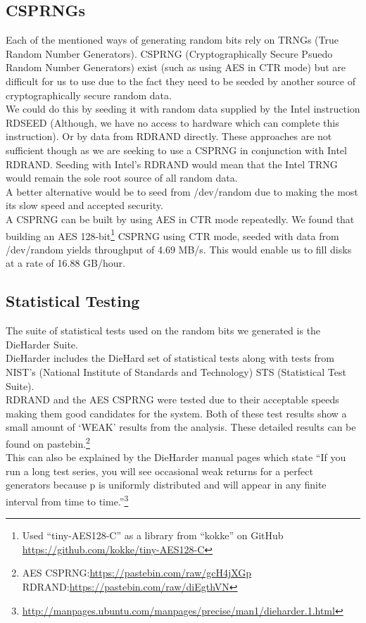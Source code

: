 \documentclass{paper}
\begin{document}
		\subsection{CSPRNGs}
			Each of the mentioned ways of generating random bits rely on TRNGs (True Random Number Generators).  CSPRNG (Cryptographically Secure Psuedo Random Number Generators) exist (such as using AES in CTR mode) but are difficult for us to use due to the fact they need 
			to be seeded by another source of cryptographically secure random data.\\ 
			We could do this by seeding it with random data supplied by the Intel instruction RDSEED (Although, we have no access to hardware which can complete this instruction). Or by data from RDRAND directly. These approaches are not sufficient though as we are seeking to use a CSPRNG in conjunction with Intel RDRAND. Seeding with Intel's RDRAND would mean that the Intel TRNG would remain 	the sole root source of all random data.\\
			A better alternative would be to seed from /dev/random due to making the most its slow speed and accepted security.\\
			
			A CSPRNG can be built by using AES in CTR mode repeatedly. We found that building an AES 128-bit\footnote{Used ``tiny-AES128-C'' as a library from ``kokke'' on GitHub \url{https://github.com/kokke/tiny-AES128-C}} CSPRNG using CTR mode, seeded with data from /dev/random yields throughput of 4.69 MB/s. This would enable us to fill disks at a rate of 16.88 GB/hour. 
			
		\subsection{Statistical Testing}
			The suite of statistical tests used on the random bits we generated is the DieHarder Suite.\\ 
			DieHarder includes the DieHard set of statistical tests along with tests from NIST's (National Institute of Standards and Technology) STS (Statistical Test Suite).\\ 
			RDRAND and the AES CSPRNG were tested due to their acceptable speeds making them good candidates for the system. Both of these test results show a small amount of `WEAK' results from the analysis. These detailed results can be found on pastebin.\footnote{AES CSPRNG:\url{https://pastebin.com/raw/gcH4jXGp} RDRAND:\url{https://pastebin.com/raw/diEgthVN}}\\
			This can also be explained by the DieHarder manual pages which state ``If you run a long test series, you will see occasional weak returns for a perfect generators because p is uniformly distributed and will appear in any finite interval from time to time.''\footnote{\url{http://manpages.ubuntu.com/manpages/precise/man1/dieharder.1.html}}
			
\end{document}
